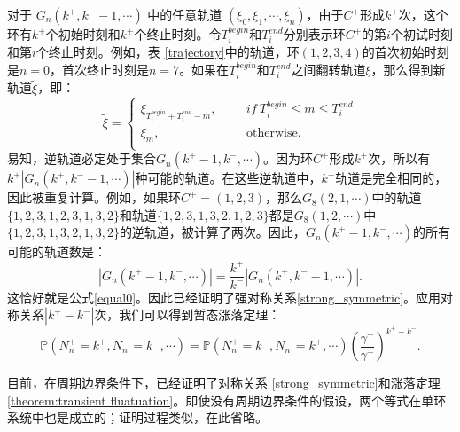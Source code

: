 对于 $G_n(k^+,k^- -1,\cdots)$ 中的任意轨道 $(\xi_0,\xi_1,\cdots,\xi_n)$，由于$C^+$形成$k^+$次，这个环有$k^+$个初始时刻和$k^+$个终止时刻。令$T_i^{begin}$和$T_i^{end}$分别表示环$C^+$的第$i$个初试时刻和第$i$个终止时刻。例如，表 \ref{trajectory}中的轨道，环$(1,2,3,4)$的首次初始时刻是$n=0$，首次终止时刻是$n=7$。如果在$T_i^{begin}$和$T_i^{end}$之间翻转轨道$\xi$，那么得到新轨道$\tilde{\xi}$，即：
\begin{equation*}
    \tilde{\xi}
    =\left\{\begin{aligned}
        \xi_{T_i^{begin}+T_i^{end}-m},&   &&if ~ T_i^{begin} \le m \le T_i^{end}\\
        \xi_m, &   && \text{otherwise}.\\
        \end{aligned}\right.
\end{equation*}
易知，逆轨道必定处于集合$G_n(k^+ -1,k^-,\cdots)$。因为环$C^+$形成$k^+$次，所以有$k^+|G_n(k^+,k^- -1, \cdots)|$种可能的轨道。在这些逆轨道中，$k^-$轨道是完全相同的，因此被重复计算。例如，如果环$C^+=(1,2,3)$，那么$G_8(2,1,\cdots)$中的轨道$\{1,2,3,1,2,3,1,3,2\}$和轨道$\{1,2,3,1,3,2,1,2,3\}$都是$G_8(1,2,\cdots)$中$\{1,2,3,1,3,2,1,3,2\}$的逆轨道，被计算了两次。因此，$G_n(k^+ -1,k^-,\cdots)$的所有可能的轨道数是：
\begin{equation}\label{equal}
    |G_n(k^+ -1,k^-,\cdots)| = \frac{k^+}{k^-}|G_n(k^+,k^- -1,\cdots)|.
\end{equation}
这恰好就是公式\ref{equal0}。因此已经证明了强对称关系\ref{strong_symmetric}。应用对称关系$|k^+ -k^-|$次，我们可以得到暂态涨落定理：
\begin{equation}\label{theorem:transient fluatuation}
	\mathbb{P}\left(N^+_n=k^+,N^-_n=k^-,\cdots\right)
	= \mathbb{P}\left(N^+_n=k^-,N^-_n=k^+,\cdots\right)\left(\frac{\gamma^+}{\gamma^-}\right)^{k^+-k^-}.
\end{equation}

目前，在周期边界条件下，已经证明了对称关系 \ref{strong_symmetric}和涨落定理 \ref{theorem:transient fluatuation}。即使没有周期边界条件的假设，两个等式在单环系统中也是成立的；证明过程类似，在此省略。

